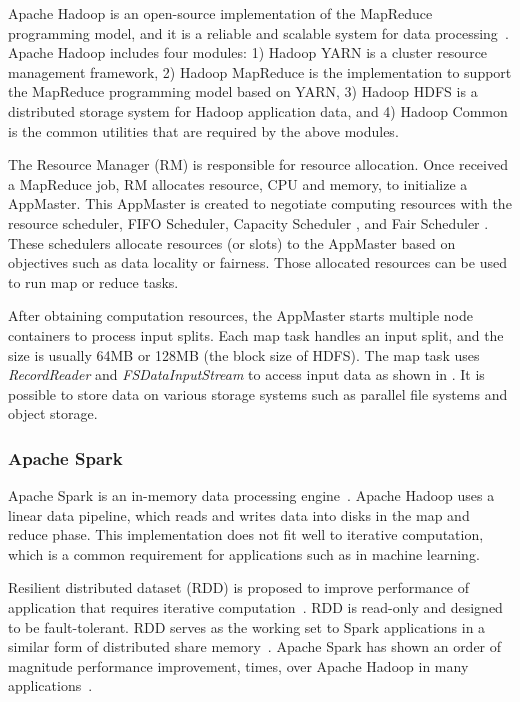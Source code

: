 Apache Hadoop is an open-source implementation of the MapReduce programming model,
and it is a reliable and scalable system for data processing~\cite{hadoop}.
Apache Hadoop includes four modules:
1) Hadoop YARN is a cluster resource management framework,
2) Hadoop MapReduce is the implementation to support the MapReduce programming model based on YARN,
3) Hadoop HDFS is a distributed storage system for Hadoop application data, and 
4) Hadoop Common is the common utilities that are required by the above modules.

The Resource Manager (RM) is responsible for resource allocation.  
Once received a MapReduce job, RM allocates resource,
\eg CPU and memory, to initialize a AppMaster.
This AppMaster is created to negotiate computing resources with
the resource scheduler,
\eg FIFO Scheduler, Capacity Scheduler \cite{CapacityScheduler}, and
Fair Scheduler \cite{FairScheduler}.
These schedulers allocate resources (or slots) to the AppMaster
based on objectives such as data locality or fairness.
Those allocated resources can be used to run map or reduce tasks.

After obtaining computation resources, the AppMaster starts
multiple node containers to process input splits.
Each map task handles an input split, and the size is usually
64MB or 128MB (the block size of HDFS).
The map task uses \emph{RecordReader} and \emph{FSDataInputStream}
to access input data as shown in \myfigure{\ref{fig:hadoop_model}}.
It is possible to store data on various storage systems such as
parallel file systems and object storage.


\subsubsection*{Apache Spark}

Apache Spark is an in-memory data processing engine~\cite{spark}.
Apache Hadoop uses a linear data pipeline,
which reads and writes data into disks in the map and reduce phase.
This implementation does not fit well to iterative computation,
which is a common requirement for applications such as in machine learning.

Resilient distributed dataset (RDD) is proposed to improve performance of
application that requires iterative computation~\cite{Zaharia2012}.
RDD is read-only and designed to be fault-tolerant.
RDD serves as the working set to Spark applications in a similar form of
distributed share memory~\cite{Zaharia2012}.
Apache Spark has shown an order of magnitude performance improvement,
 times, over Apache Hadoop in many applications~\cite{Zaharia2012, spark}.



